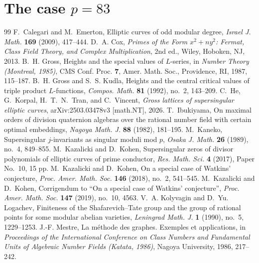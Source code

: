 \documentclass[10pt,a4paper]{amsart}
\begin{document}
\section{The case \texorpdfstring{$p=83$}{p=83}}\label{sec:example83}


\begin{thebibliography}{99}
 F.~Calegari and M.~Emerton, Elliptic curves of odd modular degree, \emph{Israel J. Math.} \textbf{169} (2009), 417--444.
 D.~A. Cox, \emph{Primes of the Form $x^2+ny^2$: Fermat, Class Field Theory, and Complex Multiplication}, 2nd ed., Wiley, Hoboken, NJ, 2013.
 B.~H. Gross, Heights and the special values of $L$-series, in \emph{Number Theory (Montreal, 1985)}, CMS Conf. Proc. \textbf{7}, Amer. Math. Soc., Providence, RI, 1987, 115--187.
 B.~H. Gross and S.~S. Kudla, Heights and the central critical values of triple product $L$-functions, \emph{Compos. Math.} \textbf{81} (1992), no.~2, 143--209.
 C.~He, G.~Korpal, H.~T.~N.~Tran, and C.~Vincent, \emph{Gross lattices of supersingular elliptic curves}, arXiv:2503.03478v3 [math.NT], 2026.
 T.~Ibukiyama, On maximal orders of division quaternion algebras over the rational number field with certain optimal embeddings, \emph{Nagoya Math. J.} \textbf{88} (1982), 181--195.
 M.~Kaneko, Supersingular $j$-invariants as singular moduli mod $p$, \emph{Osaka J. Math.} \textbf{26} (1989), no.~4, 849--855.
 M.~Kazalicki and D.~Kohen, Supersingular zeros of divisor polynomials of elliptic curves of prime conductor, \emph{Res. Math. Sci.} \textbf{4} (2017), Paper No.~10, 15 pp.
 M.~Kazalicki and D.~Kohen, On a special case of Watkins' conjecture, \emph{Proc. Amer. Math. Soc.} \textbf{146} (2018), no.~2, 541--545.
 M.~Kazalicki and D.~Kohen, Corrigendum to ``On a special case of Watkins' conjecture'', \emph{Proc. Amer. Math. Soc.} \textbf{147} (2019), no.~10, 4563.
 V.~A. Kolyvagin and D.~Yu. Logachev, Finiteness of the Shafarevich--Tate group and the group of rational points for some modular abelian varieties, \emph{Leningrad Math. J.} \textbf{1} (1990), no.~5, 1229--1253.
 J.-F. Mestre, La m\'ethode des graphes. Exemples et applications, in \emph{Proceedings of the International Conference on Class Numbers and Fundamental Units of Algebraic Number Fields (Katata, 1986)}, Nagoya University, 1986, 217--242.

\end{thebibliography}
\end{document}
